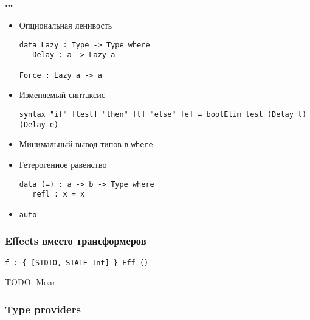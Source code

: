\begin{frame}[fragile]
   \frametitle{\dots}
   \begin{itemize}
   \item Опциональная ленивость
         \begin{lstlisting}
data Lazy : Type -> Type where
   Delay : a -> Lazy a

Force : Lazy a -> a
         \end{lstlisting}
   \item Изменяемый синтаксис
         \begin{lstlisting}
syntax "if" [test] "then" [t] "else" [e] = boolElim test (Delay t) (Delay e)
         \end{lstlisting}
   \item Минимальный вывод типов в \texttt{\color{kwcolor}where}
   \item Гетерогенное равенство
      \begin{lstlisting}
data (=) : a -> b -> Type where
   refl : x = x
      \end{lstlisting}
   \item \texttt{\color{kwcolor}auto}
      
   \end{itemize}
\end{frame}

\begin{frame}[fragile]
   \frametitle{Effects вместо трансформеров}%
   \begin{lstlisting}
f : { [STDIO, STATE Int] } Eff ()
   \end{lstlisting}
   TODO: Moar
\end{frame}

\begin{frame}[fragile]
   \frametitle{Type providers} %
   
   
\end{frame}

